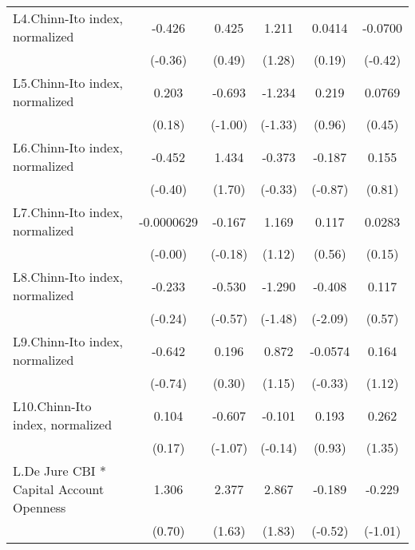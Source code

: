 {\begin{longtable}{l*{5}{c}}
\addlinespace
L4.Chinn-Ito index, normalized&   -0.426         &    0.425         &    1.211         &   0.0414         &  -0.0700         \\
                &  (-0.36)         &   (0.49)         &   (1.28)         &   (0.19)         &  (-0.42)         \\
\addlinespace
L5.Chinn-Ito index, normalized&    0.203         &   -0.693         &   -1.234         &    0.219         &   0.0769         \\
                &   (0.18)         &  (-1.00)         &  (-1.33)         &   (0.96)         &   (0.45)         \\
\addlinespace
L6.Chinn-Ito index, normalized&   -0.452         &    1.434         &   -0.373         &   -0.187         &    0.155         \\
                &  (-0.40)         &   (1.70)         &  (-0.33)         &  (-0.87)         &   (0.81)         \\
\addlinespace
L7.Chinn-Ito index, normalized&-0.0000629         &   -0.167         &    1.169         &    0.117         &   0.0283         \\
                &  (-0.00)         &  (-0.18)         &   (1.12)         &   (0.56)         &   (0.15)         \\
\addlinespace
L8.Chinn-Ito index, normalized&   -0.233         &   -0.530         &   -1.290         &   -0.408\sym{*}  &    0.117         \\
                &  (-0.24)         &  (-0.57)         &  (-1.48)         &  (-2.09)         &   (0.57)         \\
\addlinespace
L9.Chinn-Ito index, normalized&   -0.642         &    0.196         &    0.872         &  -0.0574         &    0.164         \\
                &  (-0.74)         &   (0.30)         &   (1.15)         &  (-0.33)         &   (1.12)         \\
\addlinespace
L10.Chinn-Ito index, normalized&    0.104         &   -0.607         &   -0.101         &    0.193         &    0.262         \\
                &   (0.17)         &  (-1.07)         &  (-0.14)         &   (0.93)         &   (1.35)         \\
\addlinespace
L.De Jure CBI * Capital Account Openness&    1.306         &    2.377         &    2.867         &   -0.189         &   -0.229         \\
                &   (0.70)         &   (1.63)         &   (1.83)         &  (-0.52)         &  (-1.01)         \\

\end{longtable}}
